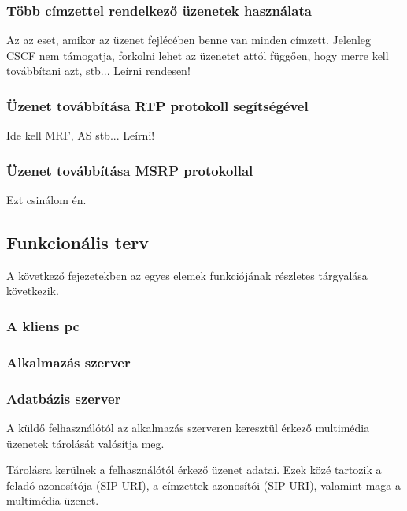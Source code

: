 \subsubsection{Több címzettel rendelkező üzenetek használata}
Az az eset, amikor az üzenet fejlécében benne van minden címzett. Jelenleg CSCF nem támogatja, forkolni lehet az üzenetet attól függően, hogy merre kell továbbítani azt, stb... Leírni rendesen!

\subsubsection{Üzenet továbbítása RTP protokoll segítségével}
Ide kell MRF, AS stb... Leírni!

\subsubsection{Üzenet továbbítása MSRP protokollal}
Ezt csinálom én.







\subsection{Funkcionális terv}


A következő fejezetekben az egyes elemek funkciójának részletes tárgyalása
következik.

\subsubsection{A kliens pc}
\label{sec:kliens_pc}


\subsubsection{Alkalmazás szerver}


\subsubsection{Adatbázis szerver}
\label{sec:adatbszerver}

A küldő felhasználótól az alkalmazás szerveren keresztül érkező
multimédia üzenetek tárolását valósítja meg.

Tárolásra kerülnek a felhasználótól érkező üzenet adatai. Ezek közé tartozik
a feladó azonosítója (SIP URI), a címzettek azonosítói (SIP URI), valamint maga a multimédia üzenet.


